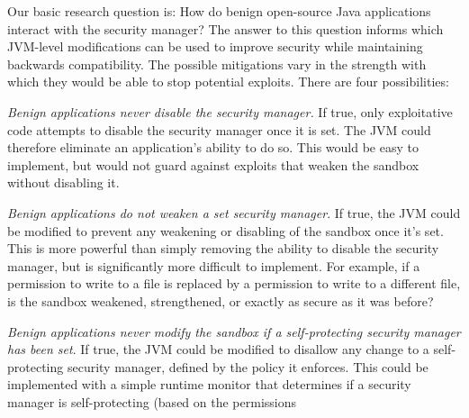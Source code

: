\documentclass{sig-alternate}
\begin{document}
Our basic research question is: How do benign open-source Java applications interact
with the security manager? The answer to this question informs which JVM-level
modifications can be used to improve security
while maintaining backwards compatibility.  The
possible mitigations vary in the strength with which they would be able to stop
potential exploits. 
There are four possibilities:
\begin{flushenum}	\setlength{\parskip}{0pt}
  \setlength{\parsep}{0pt}
  \setlength{\itemsep}{0pt}
\item \textit{Benign applications never disable the security manager.}  If true,
  only exploitative code attempts to disable the security manager once it is set.
  The JVM could therefore eliminate an application's ability to
  do so.  This would be easy to implement, but would not guard against exploits
  that weaken the sandbox without disabling it.
\item \textit{Benign applications do not weaken a set security manager}.  If
  true, the JVM could be modified to prevent any weakening or disabling of the 
  sandbox once it's set.  This is more powerful than simply removing the
  ability to disable the security manager, but is significantly more difficult to
  implement.
  For example, if a permission to write to a file is
  replaced by a permission to write to a different file, is the sandbox
  weakened, strengthened, or exactly as secure as it was before?
\item \textit{Benign applications never modify the sandbox if a self-protecting
    security manager has been set}. If true, the JVM could be modified to
  disallow any change to a self-protecting security manager, defined by the
  policy it enforces.  This could be implemented with a simple runtime monitor that
  determines if a security manager is self-protecting (based on the permissions

\end{flushenum}
\end{document}
